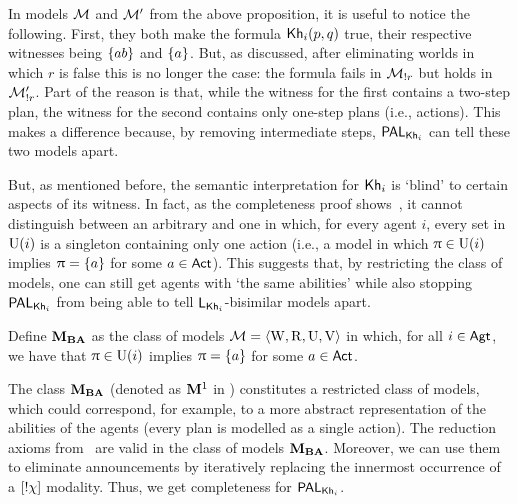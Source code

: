 In models $\mathcal{M}$ and $\mathcal{M}'$ from the above proposition, it is useful to notice the following. First, they both make the formula ${\sf Kh}_i(p,q)$ true, their respective witnesses being $\{ ab \}$ and $\{ a \}$. But, as discussed, after eliminating worlds in which $r$ is false this is no longer the case: the formula fails in $\mathcal{M}_{!r}$ but holds in $\mathcal{M}_{!r}'$. Part of the reason is that, while the witness for the first contains a two-step plan, the witness for the second contains only one-step plans (i.e., actions). This makes a difference because, by removing intermediate steps, $\mathsf{PAL}_{{\sf Kh}_i}$ can tell these two models apart. 

But, as mentioned before, the semantic interpretation for ${\sf Kh}_i$ is `blind' to certain aspects of its witness. In fact, as the completeness proof shows~\cite{AFSVQ21}, it cannot distinguish between an arbitrary \ults and one in which, for every agent $i$, every set in $\operatorname{U}(i)$ is a singleton containing only one action (i.e., a model in which $\uppi \in \operatorname{U}(i)$ implies $\uppi = \{ a \}$ for some $a \in {\rm \sf Act}$). This suggests that, by restricting the class of models, one can still get agents with `the same abilities' while also stopping $\mathsf{PAL}_{{\sf Kh}_i}$ from being able to tell $\mathsf{L}_{{\sf Kh}_i}$-bisimilar models apart.

\medskip 

\begin{definition}\label{def:class-m-one}
Define $\mathbf{M}_{\mathbf{BA}}$ as the class of models $\mathcal{M} = \langle \operatorname{W}, \operatorname{R}, \operatorname{U}, \operatorname{V} \rangle$ in which, for all $i \in {\rm \sf Agt}$, we have that $\uppi \in \operatorname{U}(i)$ implies $\uppi = \{ a \}$ for some $a \in {\rm \sf Act}$.
\end{definition}

\medskip 

The class $\mathbf{M}_{\mathbf{BA}}$ (denoted as $\mathbf{M}^1$ in \cite{AFSVQ21}) constitutes a restricted class of models, which could correspond, for example, to a more abstract representation of the abilities of the agents (every plan is modelled as a single action). The reduction axioms from~ are valid in the class of models $\mathbf{M}_{\mathbf{BA}}$. Moreover, we can use them to eliminate announcements by iteratively replacing the innermost occurrence of a $[!\chi]$ modality. Thus, we get completeness for $\mathsf{PAL}_{{\sf Kh}_i}$.

